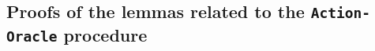 \subsection{Proofs of the lemmas related to the \texttt{Action-Oracle} procedure}\label{sec:app_action_oracle}

